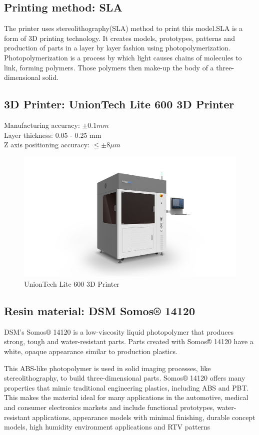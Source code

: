\documentclass{article}
\begin{document}
\subsection{Printing method: SLA}

The printer uses stereolithography(SLA) method to print this model.SLA is a form of 3D printing technology. It creates models, prototypes, patterns and production of parts in a layer by layer fashion using photopolymerization. Photopolymerization is a process by which light causes chains of molecules to link, forming polymers. Those polymers then make-up the body of a three-dimensional solid.

\subsection{3D Printer: UnionTech Lite 600 3D Printer\cite{UnionTech}}

Manufacturing accuracy: $\pm0.1 mm$\\
Layer thickness: 0.05 - 0.25 mm\\
Z axis positioning accuracy: $\leq \pm8 \mu m$

\begin{figure}[!htb]
\centering
\includegraphics[width=1\textwidth]{3DPrinter}
\caption{UnionTech Lite 600 3D Printer}
\end{figure}
\FloatBarrier
\subsection{Resin material: DSM Somos® 14120}
DSM’s Somos® 14120\cite{Somos14120} is a low-viscosity liquid photopolymer that produces strong, tough and water-resistant parts. Parts created with Somos® 14120 have a white, opaque appearance similar to production plastics.

This ABS-like photopolymer is used in solid imaging processes, like stereolithography, to build three-dimensional parts. Somos® 14120 offers many properties that mimic traditional engineering plastics, including ABS and PBT. This makes the material ideal for many applications in the automotive, medical and consumer electronics markets and include functional prototypes, water-resistant applications, appearance models with minimal finishing, durable concept models, high humidity environment applications and RTV patterns

\medskip


\end{document}
